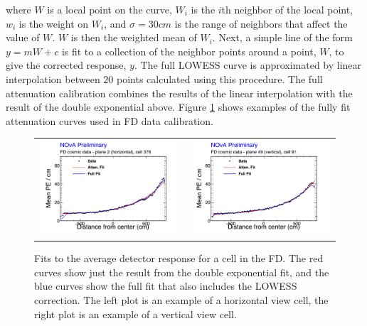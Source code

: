 \n where $W$ is a local point on the curve, $W_i$ is the $i$th neighbor of the local point, $w_i$ is the weight on $W_i$, and $\sigma = 30\unit{cm}$ is the range of neighbors that affect the value of $W$. $W$ is then the weighted mean of $W_i$. Next, a simple line of the form $y = mW + c$ is fit to a collection of the neighbor points around a point, $W$, to give the corrected response, $y$. The full LOWESS curve is approximated by linear interpolation between $20$ points calculated using this procedure. The full attenuation calibration combines the results of the linear interpolation with the result of the double exponential above. Figure \ref{fig:CalibAttenuation} shows examples of the fully fit attenuation curves used in FD data calibration.
\begin{figure}[p]
  \centering
  \begin{tabular}{c c}
    \includegraphics[width=.47\textwidth]{figures/Calib/AttenuationFDH.png} &
    \includegraphics[width=.47\textwidth]{figures/Calib/AttenuationFDV.png} \\
  \end{tabular}
  \caption[Attenuation Fits]{Fits to the average detector response for a cell in the FD. The red curves show just the result from the double exponential fit, and the blue curves show the full fit that also includes the LOWESS correction. The left plot is an example of a horizontal view cell, the right plot is an example of a vertical view cell.}
  \label{fig:CalibAttenuation}
\end{figure}

